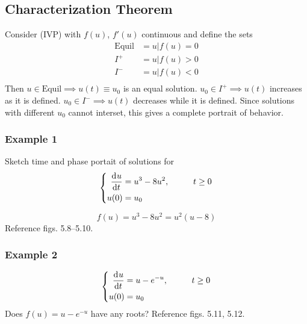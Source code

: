 \documentclass[12pt]{article}
\begin{document}
      \subsection{Characterization Theorem}
      Consider (IVP) with $f(u)$, $f'(u)$ continuous and define the sets
      \begin{equation}
        \begin{aligned}
          \text{Equil} &= {u | f(u) = 0} \\
          I^+ &= {u | f(u) > 0} \\
          I^- &= {u | f(u) < 0} \\
        \end{aligned}
      \end{equation}
      Then $u\in\text{Equil} \implies u(t)\equiv u_0$ is an equal solution.
      $u_0\in I^+ \implies u(t)$ increases as it is defined. $u_0\in I^-
      \implies u(t)$ decreases while it is defined. Since solutions with
      different $u_0$ cannot interset, this gives a complete portrait of
      behavior.

      \subsubsection{Example 1}
      Sketch time and phase portait of solutions for
      \begin{equation} \left\{
        \begin{aligned}
          \frac{\mathrm{d}^{} {u}}{\mathrm{d}{t}^{}} &= u^3-8u^2,&\qquad t\ge0 \\
          u(0) &= u_0 \\
        \end{aligned} \right.
      \end{equation}

      $$f(u)=u^3-8u^2 = u^2(u-8)$$ Reference figs. 5.8--5.10.

      \subsubsection{Example 2}
      \begin{equation} \left\{
        \begin{aligned}
          \frac{\mathrm{d}^{} {u}}{\mathrm{d}{t}^{}} &= u-e^{-u},&\qquad t\ge0 \\
          u(0) &= u_0 \\
        \end{aligned} \right.
      \end{equation}
      Does $f(u)=u-e^{-u}$ have any roots? Reference figs. 5.11, 5.12.
\end{document}

